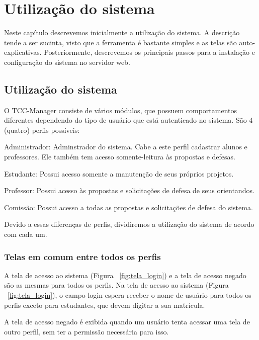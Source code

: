 \chapter{Utilização do sistema}
\label{cha:utilizacao}

Neste capítulo descrevemos inicialmente a utilização do sistema. A descrição tende
a ser sucinta, visto que a ferramenta é bastante simples e as telas são auto-explicativas.
Posteriormente, descrevemos os principais passos para a instalação e configuração
do sistema no servidor web.

\section{Utilização do sistema}
O TCC-Manager consiste de vários módulos, que possuem comportamentos diferentes dependendo do 
tipo de usuário que está autenticado no sistema. São 4 (quatro) perfis possíveis:

\begin{list}
{}
\item Administrador: Adminstrador do sistema. Cabe a este perfil cadastrar alunos e professores.
Ele também tem acesso somente-leitura às propostas e defesas.
\item Estudante: Possui acesso somente a manutenção de seus próprios projetos.
\item Professor: Possui acesso às propostas e solicitações de defesa de seus orientandos.
\item Comissão: Possui acesso a todas as propostas e solicitações de defesa do sistema.
\end{list}

Devido a essas diferenças de perfis, dividiremos a utilização do sistema de acordo com cada um.

\subsection{Telas em comum entre todos os perfis}
A tela de acesso ao sistema (Figura ~\ref{fig:tela_login}) e a tela de acesso negado são as mesmas para todos os perfis.
Na tela de acesso ao sistema (Figura ~\ref{fig:tela_login}), o campo login espera receber o nome de usuário
para todos os perfis exceto para estudantes, que devem digitar a sua matrícula.

A tela de acesso negado é exibida quando um usuário tenta acessar uma tela de outro perfil, sem
ter a permissão necessária para isso.


